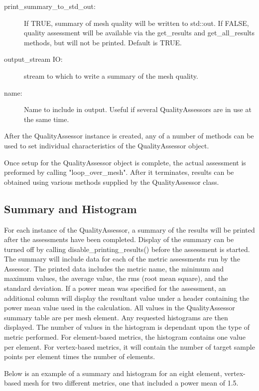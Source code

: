 \begin{description}
\item[print\_summary\_to\_std\_out:] If TRUE, summary of mesh quality will be written to std::out.  If FALSE, quality assessment will be available via the get\_results and get\_all\_results methods, but will not be printed.  Default is TRUE.

\item[output\_stream IO:] stream to which to write a summary of the mesh quality.

\item[name:] Name to include in output.  Useful if several QualityAssessors are in use at the same time.
\end{description}

  After the QualityAssessor instance is created, any of a number of methods can be used to set individual characteristics of the QualityAssessor object.

  Once setup for the QualityAssessor object  is complete, the actual assessment is preformed by calling "loop\_over\_mesh".  After it terminates, results can be obtained using various methods supplied by the QualityAssessor class.

\subsection{Summary and Histogram}

For each instance of the QualityAssessor, a summary of the results will be printed after the assessments have been completed. Display of the summary can be turned off by calling disable\_printing\_results() before the assessment is started.  The summary will include data for each of the metric assessments run by the Assessor.  The printed data includes the metric name, the minimum and maximum values, the average value, the rms (root mean square), and the standard deviation.  If a power mean was specified for the assessment, an additional column will display the resultant value under a header containing the power mean value used in the calculation.   All values in the QualityAssessor summary table are per mesh element.  Any requested histograms are then displayed.  The number of values in the histogram is dependant upon the type of metric performed.  For element-based metrics, the histogram contains one value per element.  For vertex-based metrics, it will contain the number of target sample points per element times the number of elements.

  Below is an example of a summary and histogram for an eight element, vertex-based mesh for two different metrics, one that included a power mean of 1.5.


